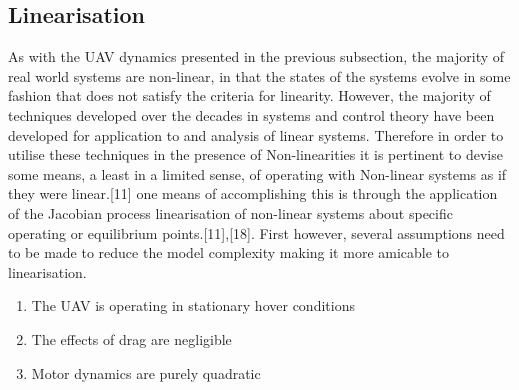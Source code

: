 \documentclass[12pt,a4paper,twoside]{report}
\begin{document}
			\newpage
		
		\subsection{Linearisation}
				
			As with the UAV dynamics presented in the previous subsection, the majority of real world systems are non-linear, in that the states of the systems evolve in some fashion that does not satisfy the criteria for linearity. However, the majority of techniques developed over the decades in systems and control theory have been developed for application to and analysis of linear systems. Therefore in order to utilise these techniques in the presence of Non-linearities it is pertinent to devise some means, a least in a limited sense, of operating with Non-linear systems as if they were linear.[11] one means of accomplishing this is through the application of the  Jacobian process linearisation of non-linear systems about specific operating or equilibrium points.[11],[18]. First however, several assumptions need to be made to reduce the model complexity making it more amicable to linearisation. 
				
			\begin{enumerate}
				\item 
					The UAV is operating in stationary hover conditions
				\item 
					The effects of drag are negligible
				\item 
					Motor dynamics are purely quadratic
			\end{enumerate}
\end{document}
